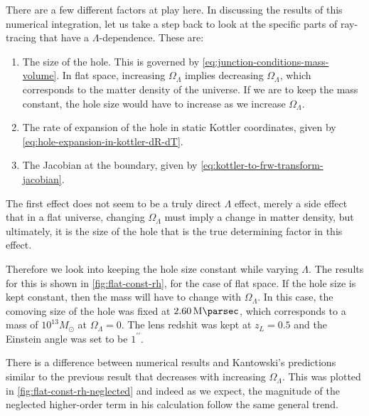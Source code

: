 There are a few different factors at play here. In discussing the results of this numerical integration, let us take a step back to look at the specific parts of ray-tracing that have a $\Lambda$-dependence. These are:
\begin{enumerate}
  \item The size of the hole. This is governed by \autoref{eq:junction-conditions-mass-volume}. In flat space, increasing $\Omega_{\Lambda}$ implies decreasing $\Omega_{\Lambda}$, which corresponds to the matter density of the universe. If we are to keep the mass constant, the hole size would have to increase as we increase $\Omega_{\Lambda}$. 
  \item The rate of expansion of the hole in static Kottler coordinates, given by \autoref{eq:hole-expansion-in-kottler-dR-dT}.  
  \item The Jacobian at the boundary, given by \autoref{eq:kottler-to-frw-transform-jacobian}.
\end{enumerate}

The first effect does not seem to be a truly direct $\Lambda$ effect, merely a side effect that in a flat universe, changing $\Omega_{\Lambda}$ must imply a change in matter density, but ultimately, it is the size of the hole that is the true determining factor in this effect. 

Therefore we look into keeping the hole size constant while varying $\Lambda$. The results for this is shown in \autoref{fig:flat-const-rh}, for the case of flat space. If the hole size is kept constant, then the mass will have to change with $\Omega_{\Lambda}$. In this case, the comoving size of the hole was fixed at $\SI{2.60}{\mega\parsec}$, which corresponds to a mass of $10^{13}M_{\odot}$ at $\Omega_{\Lambda} = 0$. The lens redshit was kept at $z_L = 0.5$ and the Einstein angle was set to be $1^{\prime\prime}$.

There is a difference between numerical results and Kantowski's predictions similar to the previous result that decreases with increasing $\Omega_{\Lambda}$. This was plotted in \autoref{fig:flat-const-rh-neglected} and indeed as we expect, the magnitude of the neglected higher-order term in his calculation follow the same general trend.

